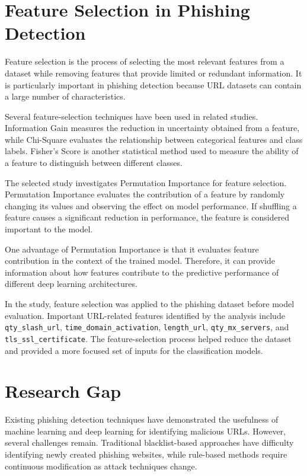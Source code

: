 \documentclass[12pt,a4paper]{report}
\begin{document}
\section{Feature Selection in Phishing Detection}

Feature selection is the process of selecting the most relevant features from a dataset while removing features that provide limited or redundant information. It is particularly important in phishing detection because URL datasets can contain a large number of characteristics.

Several feature-selection techniques have been used in related studies. Information Gain measures the reduction in uncertainty obtained from a feature, while Chi-Square evaluates the relationship between categorical features and class labels. Fisher's Score is another statistical method used to measure the ability of a feature to distinguish between different classes.

The selected study investigates Permutation Importance for feature selection. Permutation Importance evaluates the contribution of a feature by randomly changing its values and observing the effect on model performance. If shuffling a feature causes a significant reduction in performance, the feature is considered important to the model.

One advantage of Permutation Importance is that it evaluates feature contribution in the context of the trained model. Therefore, it can provide information about how features contribute to the predictive performance of different deep learning architectures.

In the study, feature selection was applied to the phishing dataset before model evaluation. Important URL-related features identified by the analysis include \texttt{qty\_slash\_url}, \texttt{time\_domain\_activation}, \texttt{length\_url}, \texttt{qty\_mx\_servers}, and \texttt{tls\_ssl\_certificate}. The feature-selection process helped reduce the dataset and provided a more focused set of inputs for the classification models.

\section{Research Gap}

Existing phishing detection techniques have demonstrated the usefulness of machine learning and deep learning for identifying malicious URLs. However, several challenges remain. Traditional blacklist-based approaches have difficulty identifying newly created phishing websites, while rule-based methods require continuous modification as attack techniques change.
\end{document}
